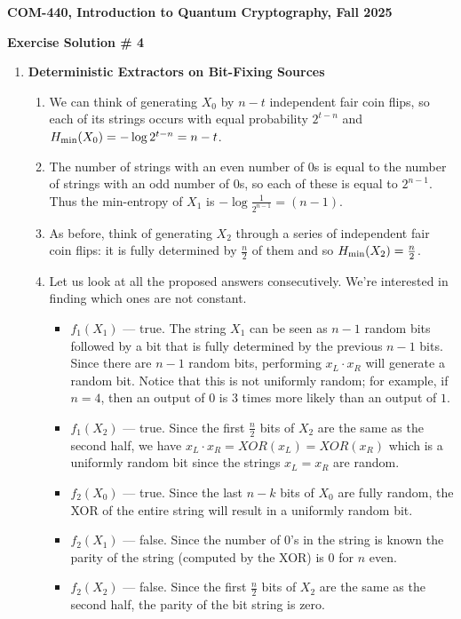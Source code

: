 \documentclass[12pt]{article}
\newcommand{\header}[1]{\begin{center} {\large\bf #1} \end{center}}
\begin{document}
\header{COM-440, Introduction to Quantum Cryptography, Fall 2025}
\header{\bf Exercise Solution \# 4}


\begin{enumerate}

\item {\bf Deterministic Extractors on Bit-Fixing Sources}

\begin{enumerate}
\item We can think of generating $X_0$ by $n-t$ independent fair coin flips, so each of its strings occurs with equal probability $2^{t-n}$ and $H_{\rm min} (X_0) = -\log{2^{t-n}}=n-t$.

\item The number of strings with an even number of $0$s is equal to the number of strings with an odd number of $0$s, so each of these is equal to $2^{n-1}$. Thus the min-entropy of $X_1$ is $-\log \frac{1}{2^{n-1}}=(n-1)$.

\item As before, think of generating $X_2$ through a series of independent fair coin flips: it is fully determined by $\frac {n}{2}$ of them and so $H_{\rm min}(X_2)=\frac{n}{2}$.

\item Let us look at all the proposed answers consecutively. We're interested in finding which ones are not constant.
\begin{itemize}
\item $f_1(X_1)$ --- true. The string $X_1$ can be seen as $n-1$ random bits followed by a bit that is fully determined by the previous $n-1$ bits. Since there are $n-1$ random bits, performing \(x_ L\cdot x_ R \) will generate a random bit. Notice that this is not uniformly random; for example, if $n=4$, then an output of $0$ is $3$ times more likely than an output of $1$.
\item $f_1(X_2)$ --- true. Since the first \(\frac{n}{2}\) bits of $X_2$ are the same as the second half, we have \(x_ L\cdot x_ R  = XOR(x_L) = XOR(x_R)\) which is a uniformly random bit since the strings \(x_L=x_R\) are random.
\item $f_2(X_0)$ --- true. Since the last \(n-k\) bits of $X_0$ are fully random, the XOR of the entire string will result in a uniformly random bit.
\item $f_2(X_1)$ --- false. Since the number of $0$'s in the string is known the parity of the string (computed by the XOR) is $0$ for $n$ even.
\item $f_2(X_2)$ --- false. Since the first \(\frac{n}{2}\) bits of $X_2$ are the same as the second half, the parity of the bit string is zero.
\end{itemize}


\end{enumerate}
\end{enumerate}
\end{document}

